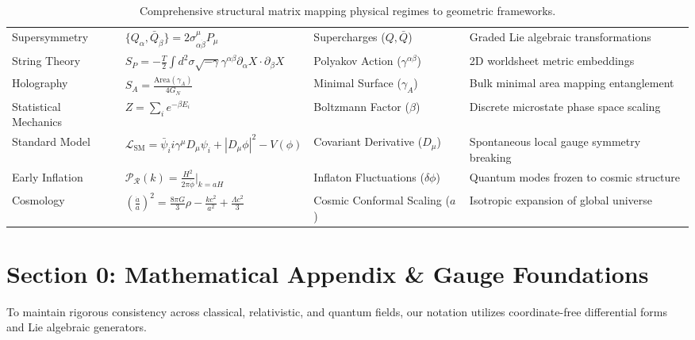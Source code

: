 \documentclass[11pt,a4paper]{article}
\begin{document}
\begin{table}[H]
\begin{tabularx}{\textwidth}{l l l X}
Supersymmetry & $\{Q_{\alpha}, \bar{Q}_{\dot{\beta}}\} = 2\sigma^{\mu}_{\alpha\dot{\beta}} P_{\mu}$ & Supercharges ($Q, \bar{Q}$) & Graded Lie algebraic transformations \\ \addlinespace[2pt]
String Theory & $S_P = -\frac{T}{2} \int d^2\sigma \sqrt{- \gamma}\gamma^{\alpha\beta}\partial_{\alpha} X \cdot \partial_{\beta} X$ & Polyakov Action ($\gamma^{\alpha\beta}$) & 2D worldsheet metric embeddings \\ \addlinespace[2pt]
Holography & $S_A = \frac{\text{Area}(\gamma_A)}{4G_N}$ & Minimal Surface ($\gamma_A$) & Bulk minimal area mapping entanglement \\ \addlinespace[2pt]
Statistical Mechanics & $Z = \sum_i e^{-\beta E_i}$ & Boltzmann Factor ($\beta$) & Discrete microstate phase space scaling \\ \addlinespace[2pt]
Standard Model & $\mathcal{L}_{\text{SM}} = \bar{\psi}_i i\gamma^{\mu} D_{\mu} \psi_i + |D_{\mu}\phi|^2 - V(\phi)$ & Covariant Derivative ($D_{\mu}$) & Spontaneous local gauge symmetry breaking \\ \addlinespace[2pt]
Early Inflation & $\mathcal{P}_{\mathcal{R}}(k) = \frac{H^2}{2\pi \dot{\phi}}\biggr\vert_{k=aH}$ & Inflaton Fluctuations ($\delta\phi$) & Quantum modes frozen to cosmic structure \\ \addlinespace[2pt]
Cosmology & $(\frac{\dot{a}}{a})^2 = \frac{8\pi G}{3}\rho - \frac{kc^2}{a^2} + \frac{\Lambda c^2}{3}$ & Cosmic Conformal Scaling ($a$) & Isotropic expansion of global universe \\ \bottomrule
\end{tabularx}
\caption{Comprehensive structural matrix mapping physical regimes to geometric frameworks.}
\end{table}

\newpage


\section*{Section 0: Mathematical Appendix \& Gauge Foundations}
To maintain rigorous consistency across classical, relativistic, and quantum fields, our notation utilizes coordinate-free differential forms and Lie algebraic generators.
\end{document}
